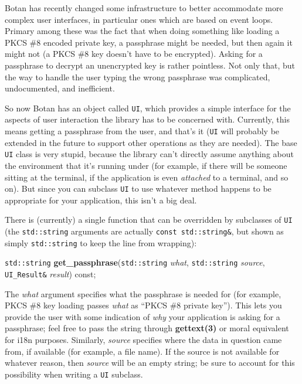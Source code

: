 \documentclass{article}
\newcommand{\function}[1]{\textbf{#1}}
\newcommand{\type}[1]{\texttt{#1}}
\renewcommand{\arg}[1]{\textsl{#1}}
\begin{document}
Botan has recently changed some infrastructure to better accommodate more
complex user interfaces, in particular ones which are based on event
loops. Primary among these was the fact that when doing something like loading
a PKCS \#8 encoded private key, a passphrase might be needed, but then again it
might not (a PKCS \#8 key doesn't have to be encrypted). Asking for a
passphrase to decrypt an unencrypted key is rather pointless. Not only that,
but the way to handle the user typing the wrong passphrase was complicated,
undocumented, and inefficient.

So now Botan has an object called \type{UI}, which provides a simple interface
for the aspects of user interaction the library has to be concerned
with. Currently, this means getting a passphrase from the user, and that's it
(\type{UI} will probably be extended in the future to support other operations
as they are needed). The base \type{UI} class is very stupid, because the
library can't directly assume anything about the environment that it's running
under (for example, if there will be someone sitting at the terminal, if the
application is even \emph{attached} to a terminal, and so on). But since you
can subclass \type{UI} to use whatever method happens to be appropriate for
your application, this isn't a big deal.

There is (currently) a single function that can be overridden by subclasses of
\type{UI} (the \type{std::string} arguments are actually \type{const
std::string\&}, but shown as simply \type{std::string} to keep the line from
wrapping):

\noindent
\type{std::string} \function{get\_passphrase}(\type{std::string} \arg{what},
                                              \type{std::string} \arg{source},
                                     \type{UI\_Result\&} \arg{result}) const;

The \arg{what} argument specifies what the passphrase is needed for (for
example, PKCS \#8 key loading passes \arg{what} as ``PKCS \#8 private
key''). This lets you provide the user with some indication of \emph{why} your
application is asking for a passphrase; feel free to pass the string through
\function{gettext(3)} or moral equivalent for i18n purposes. Similarly,
\arg{source} specifies where the data in question came from, if available (for
example, a file name). If the source is not available for whatever reason, then
\arg{source} will be an empty string; be sure to account for this possibility
when writing a \type{UI} subclass.
\end{document}
